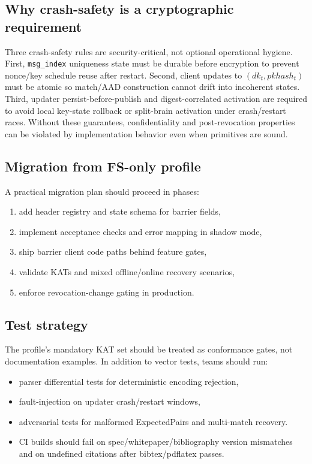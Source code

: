 \documentclass[11pt]{article}
\begin{document}
\subsection{Why crash-safety is a cryptographic requirement}
Three crash-safety rules are security-critical, not optional operational hygiene. First, \texttt{msg\_index} uniqueness state must be durable before encryption to prevent nonce/key schedule reuse after restart. Second, client updates to \((dk_t, pkhash_t)\) must be atomic so match/AAD construction cannot drift into incoherent states. Third, updater persist-before-publish and digest-correlated activation are required to avoid local key-state rollback or split-brain activation under crash/restart races. Without these guarantees, confidentiality and post-revocation properties can be violated by implementation behavior even when primitives are sound.

\subsection{Migration from FS-only profile}
A practical migration plan should proceed in phases:
\begin{enumerate}
  \item add header registry and state schema for barrier fields,
  \item implement acceptance checks and error mapping in shadow mode,
  \item ship barrier client code paths behind feature gates,
  \item validate KATs and mixed offline/online recovery scenarios,
  \item enforce revocation-change gating in production.
\end{enumerate}

\subsection{Test strategy}
The profile's mandatory KAT set should be treated as conformance gates, not documentation examples. In addition to vector tests, teams should run:
\begin{itemize}
  \item parser differential tests for deterministic encoding rejection,
  \item fault-injection on updater crash/restart windows,
  \item adversarial tests for malformed ExpectedPairs and multi-match recovery.
  \item CI builds should fail on spec/whitepaper/bibliography version mismatches and on undefined citations after bibtex/pdflatex passes.
\end{itemize}
\end{document}
